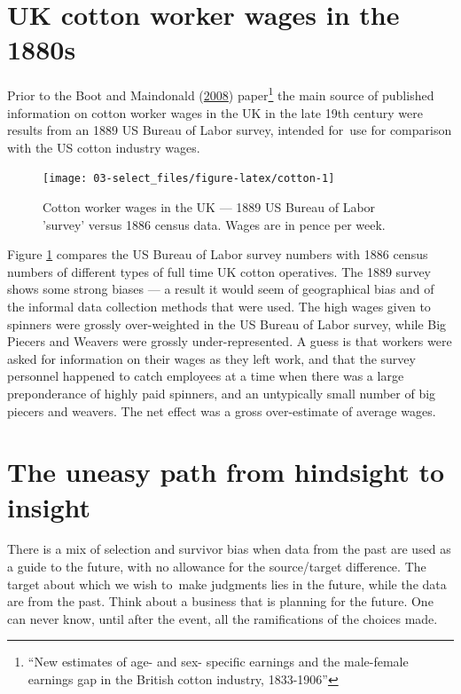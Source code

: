 \documentclass[
  10pt,
  b5paper]{book}
\begin{document}
\hypertarget{uk-cotton-worker-wages-in-the-1880s}{%
\section{UK cotton worker wages in the 1880s}\label{uk-cotton-worker-wages-in-the-1880s}}

Prior to the Boot and Maindonald (\protect\hyperlink{ref-boot2008new}{2008}) paper\footnote{``New estimates of age- and sex- specific
  earnings and the male-female earnings gap in the British cotton
  industry, 1833-1906''} the main source of published information on
cotton worker wages in the UK in the late 19th century were results
from an 1889 US Bureau of Labor survey, intended for~use for
comparison with the US cotton industry wages.

\begin{figure}

{\centering \texttt{[image: 03-select\_files/figure-latex/cotton-1]} 

}

\caption{Cotton worker wages in the UK --- 1889 US Bureau of Labor 'survey'
versus 1886 census data. Wages are in pence per week.}\label{fig:cotton}
\end{figure}

Figure \ref{fig:cotton} compares the US Bureau of Labor
survey numbers with 1886 census numbers of different types
of full time UK cotton operatives.
The 1889 survey shows some strong biases --- a result it
would seem of geographical bias and of the informal data
collection methods that were used. The high wages given to
spinners were grossly over-weighted in the US Bureau of
Labor survey, while Big Piecers and Weavers were grossly
under-represented. A guess is that workers were asked for
information on their wages as they left work, and that
the survey personnel happened to catch employees at a time
when there was a large preponderance of highly paid spinners,
and an untypically small number of big piecers and weavers.
The net effect was a gross over-estimate of average wages.

\hypertarget{the-uneasy-path-from-hindsight-to-insight}{%
\section{The uneasy path from hindsight to insight}\label{the-uneasy-path-from-hindsight-to-insight}}

There is a mix of selection and survivor bias when data
from the past are used as a guide to the future, with no
allowance for the source/target difference. The target about
which we wish to~make judgments lies in the future, while the
data are from the past. Think about a business that is
planning for the future. One can never know, until after the
event, all the ramifications of the choices made.
\end{document}
